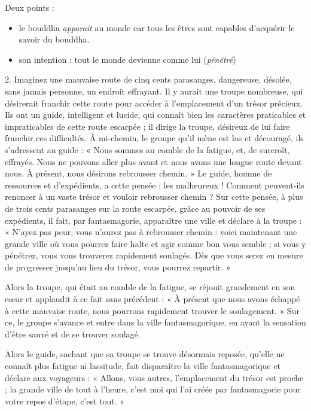 Deux points : 
\begin{itemize}
    \item le bouddha \textit{apparait} au monde car tous les êtres sont capables d'acquérir le savoir du bouddha.
    \item son intention : tout le monde devienne comme lui (\textit{pénétré})
\end{itemize}

\begin{singlequote}
    2.	Imaginez une mauvaise route de cinq cents parasanges, dangereuse, désolée, sans jamais personne, un endroit effrayant. Il y aurait une troupe nombreuse, qui désirerait franchir cette route pour accéder à l’emplacement d’un trésor précieux. Ils ont un guide, intelligent et lucide, qui connaît bien les caractères praticables et impraticables de cette route escarpée ; il dirige la troupe, désireux de lui faire franchir ces difficultés. À mi-chemin, le groupe qu’il mène est las et découragé, ils s’adressent au guide : « Nous sommes au comble de la fatigue, et, de surcroît, effrayés. Nous ne pouvons aller plus avant et nous avons une longue route devant nous. À présent, nous désirons rebrousser chemin. » Le guide, homme de ressources et d’expédients, a cette pensée : les malheureux ! Comment peuvent-ils renoncer à un vaste trésor et vouloir rebrousser chemin ? Sur cette pensée, à plus de trois cents parasanges sur la route escarpée, grâce au pouvoir de ses expédients, il fait, par fantasmagorie, apparaître une ville et déclare à la troupe : « N’ayez pas peur, vous n’aurez pas à rebrousser chemin : voici maintenant une grande ville où vous pourrez faire halte et agir comme bon vous semble ; si vous y pénétrez, vous vous trouverez rapidement soulagés. Dès que vous serez en mesure de progresser jusqu’au lieu du trésor, vous pourrez repartir. »

Alors la troupe, qui était au comble de la fatigue, se réjouit grandement en son cœur et applaudit à ce fait sans précédent : « À présent que nous avons échappé à cette mauvaise route, nous pourrons rapidement trouver le soulagement. » Sur ce, le groupe s’avance et entre dans la ville fantasmagorique, en ayant la sensation d’être sauvé et de se trouver soulagé.
 
Alors le guide, sachant que sa troupe se trouve désormais reposée, qu’elle ne connaît plus fatigue ni lassitude, fait disparaître la ville fantasmagorique et déclare aux voyageurs : « Allons, vous autres, l’emplacement du trésor est proche ; la grande ville de tout à l’heure, c’est moi qui l’ai créée par fantasmagorie pour votre repos d’étape, c’est tout. »


\end{singlequote}
